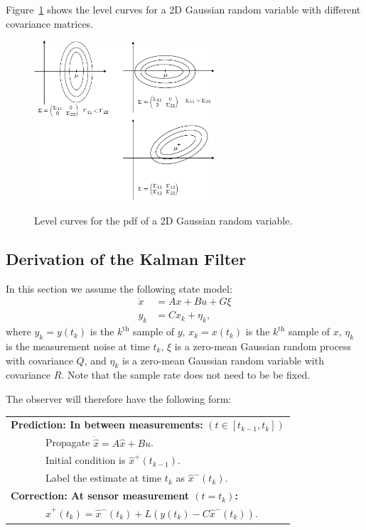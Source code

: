 {Figure~\ref{fig:estimation_gaussian_level_curves} shows the level
curves for a 2D Gaussian random variable with different covariance
matrices.
\begin{figure}
  \centering
  \includegraphics[width=0.6\textwidth]{chap11_attitude_estimation/figures/estimation-gaussian-level-curves}\\
  \caption{Level curves for the pdf of a 2D Gaussian random variable.}
  \label{fig:estimation_gaussian_level_curves}
\end{figure}


\subsection{Derivation of the Kalman Filter}

In this section we assume the following state model:
\begin{align*}
\dot{x} &= Ax + Bu + G\xi \\
y_k &= Cx_k + \eta_k,
\end{align*}
where $y_k = y(t_k)$ is the $k^{\text{th}}$ sample of $y$, $x_k =
x(t_k)$ is the $k^{\text{th}}$ sample of $x$, $\eta_k$ is the
measurement noise at time $t_k$, $\xi$ is a zero-mean Gaussian
random process with covariance $Q$, and $\eta_k$ is a zero-mean
Gaussian random variable with covariance $R$.  Note that the sample
rate does not need to be be fixed.

The observer will therefore have the following form:

\begin{tabular}{l}
\textbf{Prediction: In between measurements:} $(t\in[t_{k-1},t_k])$ \\
~~~~~~~Propagate $\dot{\hat{x}}=A\hat{x} + Bu$. \\
~~~~~~~Initial condition is $\hat{x}^+(t_{k-1}).$  \\
~~~~~~~Label the estimate at time $t_k$ as $\hat{x}^-(t_k)$.
\\
\textbf{Correction: At sensor measurement $(t=t_k)$:} \\
~~~~~~~$\hat{x}^+(t_k) = \hat{x}^-(t_k) + L\left( y(t_k) - C\hat{x}^-(t_k) \right).$ \\
\end{tabular}

}
